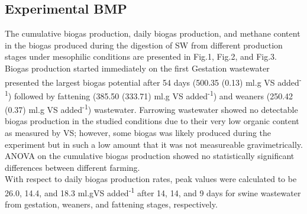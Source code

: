 \subsection{Experimental BMP}
The cumulative biogas production, daily biogas production, and methane content in the biogas produced during the digestion of SW from different production stages under mesophilic conditions are presented in Fig.1, Fig.2, and Fig.3.
Biogas production started immediately on the first 
Gestation wastewater presented the largest biogas potential after 54 days (500.35 (0.13) ml.g VS added\textsuperscript{-1}) followed by fattening (385.50 (333.71) ml.g VS added\textsuperscript{-1}) and weaners (250.42 (0.37) ml.g VS added\textsuperscript{-1}) wastewater. Farrowing wastewater showed no detectable biogas production in the studied conditions due to their very low organic content as measured by VS; however, some biogas was likely produced during the experiment but in such a low amount that it was not measureable gravimetrically.  ANOVA on the cumulative biogas production showed no statistically significant differences between different farming.\\
With respect to daily biogas production rates, peak values were calculated to be 26.0, 14.4, and 18.3 ml.gVS added\textsuperscript{-1} after 14, 14, and 9 days for swine wastewater from gestation, weaners, and fattening stages, respectively.